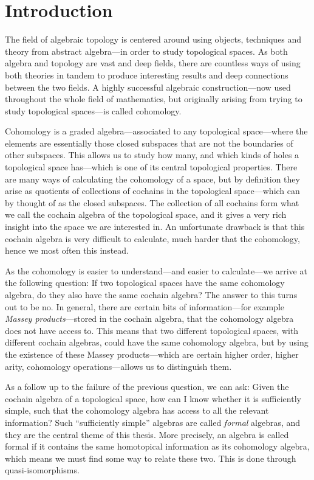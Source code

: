 
\section{Introduction}

The field of algebraic topology is centered around using objects, techniques and theory from abstract algebra---in order to study topological spaces. As both algebra and topology are vast and deep fields, there are countless ways of using both theories in tandem to produce interesting results and deep connections between the two fields. A highly successful algebraic construction---now used throughout the whole field of mathematics, but originally arising from trying to study topological spaces---is called cohomology. 

Cohomology is a graded algebra---associated to any topological space---where the elements are essentially those closed subspaces that are not the boundaries of other subspaces. This allows us to study how many, and which kinds of holes a topological space has---which is one of its central topological properties. There are many ways of calculating the cohomology of a space, but by definition they arise as quotients of collections of cochains in the topological space---which can by thought of as the closed subspaces. The collection of all cochains form what we call the cochain algebra of the topological space, and it gives a very rich insight into the space we are interested in. An unfortunate drawback is that this cochain algebra is very difficult to calculate, much harder that the cohomology, hence we most often this instead. 

As the cohomology is easier to understand---and easier to calculate---we arrive at the following question: If two topological spaces have the same cohomology algebra, do they also have the same cochain algebra? The answer to this turns out to be no. In general, there are certain bits of information---for example \emph{Massey products}---stored in the cochain algebra, that the cohomology algebra does not have access to. This means that two different topological spaces, with different cochain algebras, could have the same cohomology algebra, but by using the existence of these Massey products---which are certain higher order, higher arity, cohomology operations---allows us to distinguish them. 

As a follow up to the failure of the previous question, we can ask: Given the cochain algebra of a topological space, how can I know whether it is sufficiently simple, such that the cohomology algebra has access to all the relevant information? Such ``sufficiently simple'' algebras are called \emph{formal} algebras, and they are the central theme of this thesis. More precisely, an algebra is called formal if it contains the same homotopical information as its cohomology algebra, which means we must find some way to relate these two. This is done through quasi-isomorphisms. 

